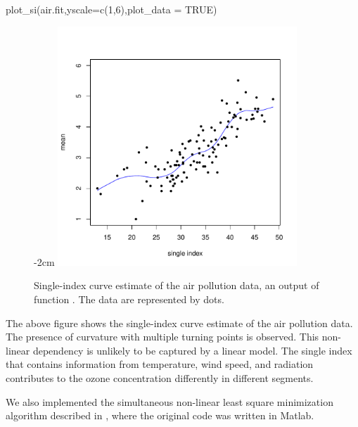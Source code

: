\begin{Schunk}
  \begin{Sinput}
  plot_si(air.fit,yscale=c(1,6),plot_data = TRUE)
  \end{Sinput}

  \begin{figure}[ht]
    \centering
    \addtolength{\leftskip} {-2cm}
    \addtolength{\rightskip}{-2cm}
    \includegraphics[width=9cm]{gplsim_files/figure-latex/unnamed-chunk-3-1} 
    \caption{Single-index curve estimate of the air pollution data, an output of function . The data are represented
    	by dots.}
  \end{figure}
\end{Schunk}

The above figure shows the single-index curve estimate of the air pollution data. The presence of curvature with multiple turning points is observed. This non-linear dependency is unlikely to be captured by a linear model. The single index that contains information from temperature, wind speed, and radiation contributes to the ozone concentration differently in different segments. 

We also implemented the simultaneous non-linear least square minimization algorithm described in \cite{yu_penalized_2002}, where the original code was written in Matlab. 

